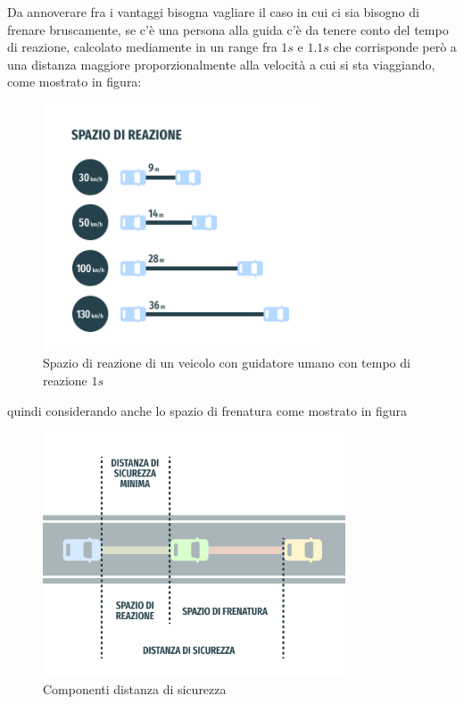 \newline
Da annoverare fra i vantaggi bisogna vagliare il caso in cui ci sia bisogno di frenare bruscamente, se c'è una persona alla guida c'è da tenere conto del tempo di reazione, calcolato mediamente in un range fra $1s$ e $1.1s$ che corrisponde però a una distanza maggiore proporzionalmente alla velocità a cui si sta viaggiando, come mostrato in figura:
\begin{figure}[H]
    \centering
    \captionsetup{justification=centering, margin=2cm}
    \includegraphics[width=0.75\textwidth]{images/1-introduction/spazio-reazione.png}
    \caption{Spazio di reazione di un veicolo con guidatore umano con tempo di reazione $1s$ \cite{distanza_sicurezza_autoscuola_quattroruote}}
    \label{fig:spazio-reazione}
\end{figure}
\noindent quindi considerando anche lo spazio di frenatura come mostrato in figura

\begin{figure}[H]
    \centering
    \captionsetup{justification=centering, margin=2cm}
    \includegraphics[width=0.8\textwidth]{images/1-introduction/distanze-sicurezza-spazi.png}
    \caption{Componenti distanza di sicurezza \cite{distanza_sicurezza_patentino_online}}
    \label{fig:distanze-sicurezza-spazi}
\end{figure}

